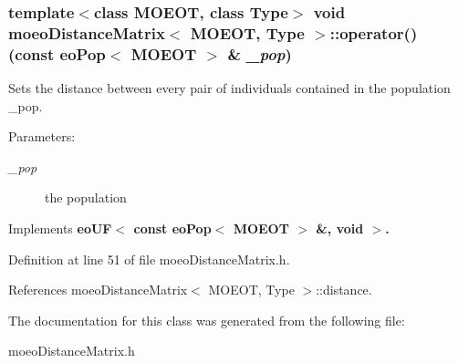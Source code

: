 \subsubsection{\setlength{\rightskip}{0pt plus 5cm}template$<$class MOEOT, class Type$>$ void \bf{moeo\-Distance\-Matrix}$<$ MOEOT, Type $>$::operator() (const \bf{eo\-Pop}$<$ MOEOT $>$ \& {\em \_\-pop})\hspace{0.3cm}{\tt  [inline, virtual]}}\label{classmoeoDistanceMatrix_ae3d433983a0a3d369cc17971498ad48}


Sets the distance between every pair of individuals contained in the population \_\-pop. 

\begin{Desc}
\item[Parameters:]
\begin{description}
\item[{\em \_\-pop}]the population \end{description}
\end{Desc}


Implements \bf{eo\-UF$<$ const eo\-Pop$<$ MOEOT $>$ \&, void $>$}.

Definition at line 51 of file moeo\-Distance\-Matrix.h.

References moeo\-Distance\-Matrix$<$ MOEOT, Type $>$::distance.

The documentation for this class was generated from the following file:\begin{CompactItemize}
\item 
moeo\-Distance\-Matrix.h\end{CompactItemize}
